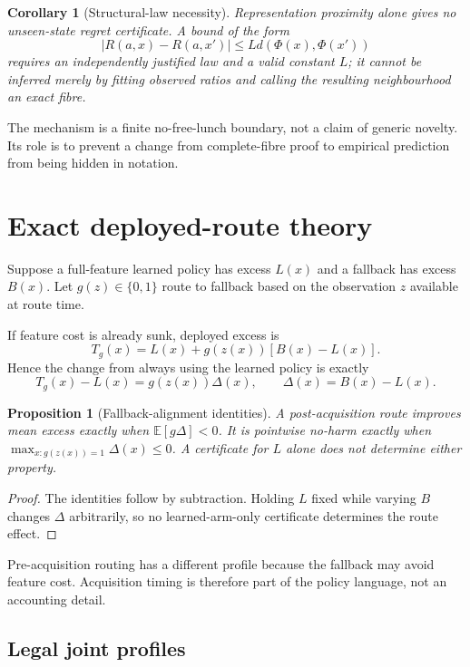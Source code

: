 \documentclass[11pt]{article}
\newtheorem{proposition}[theorem]{Proposition}
\newtheorem{corollary}[theorem]{Corollary}
\theoremstyle{definition}
\theoremstyle{remark}
\begin{document}
\begin{corollary}[Structural-law necessity]
Representation proximity alone gives no unseen-state regret certificate.  A bound of the form
\[
 |R(a,x)-R(a,x')|\le Ld(\Phi(x),\Phi(x'))
\]
requires an independently justified law and a valid constant $L$; it cannot be inferred merely by fitting observed ratios and calling the resulting neighbourhood an exact fibre.
\end{corollary}

The mechanism is a finite no-free-lunch boundary, not a claim of generic novelty.  Its role is to prevent a change from complete-fibre proof to empirical prediction from being hidden in notation.

\section{Exact deployed-route theory}

Suppose a full-feature learned policy has excess $L(x)$ and a fallback has excess $B(x)$.  Let $g(z)\in\{0,1\}$ route to fallback based on the observation $z$ available at route time.

If feature cost is already sunk, deployed excess is
\[
 T_g(x)=L(x)+g(z(x))[B(x)-L(x)].
\]
Hence the change from always using the learned policy is exactly
\[
 T_g(x)-L(x)=g(z(x))\Delta(x),\qquad \Delta(x)=B(x)-L(x).
\]

\begin{proposition}[Fallback-alignment identities]\label{prop:alignment}
A post-acquisition route improves mean excess exactly when $\mathbb E[g\Delta]<0$.  It is pointwise no-harm exactly when $\max_{x:g(z(x))=1}\Delta(x)\le0$.  A certificate for $L$ alone does not determine either property.
\end{proposition}
\begin{proof}
The identities follow by subtraction.  Holding $L$ fixed while varying $B$ changes $\Delta$ arbitrarily, so no learned-arm-only certificate determines the route effect.
\end{proof}

Pre-acquisition routing has a different profile because the fallback may avoid feature cost.  Acquisition timing is therefore part of the policy language, not an accounting detail.



\subsection{Legal joint profiles}
\end{document}
